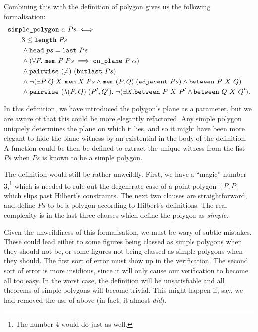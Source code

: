 Combining this with the definition of polygon gives us the following formalisation:
\begin{equation}\label{eq:SimplePolygonDef}
  \begin{split}
    &\code{simple\_polygon}\ \alpha\ Ps \iff \\
    &\qquad 3 \leq \code{length}\ Ps\\
    &\qquad\wedge \code{head}\ ps = \code{last}\ Ps\\
    &\qquad\wedge (\forall P.\;\code{mem}\ P\ Ps \implies \code{on\_plane}\ P\ \alpha)\\
    &\qquad\wedge \code{pairwise}\ (\neq)\ (\code{butlast}\ Ps)\\
    &\qquad\wedge \neg(\exists P\;Q\;X.\; \code{mem}\;X\;Ps\wedge\code{mem}\;(P,Q)\;(\code{adjacent}\;Ps)\wedge\between{P}{X}{Q})\\
    &\qquad\wedge \code{pairwise}\ (\lambda(P,Q)\;(P',Q').\;\neg(\exists X. \between{P}{X}{P'} \wedge \between{Q}{X}{Q'}).
  \end{split}
\end{equation}

In this definition, we have introduced the polygon's plane as a parameter, but we are aware of that this could be more elegantly refactored. Any simple polygon uniquely determines the plane on which it lies, and so it might have been more elegant to hide the plane witness by an existential in the body of the definition. A function could be then be defined to extract the unique witness from the list $Ps$ when $Ps$ is known to be a simple polygon. 

The definition would still be rather unweildly. First, we have a ``magic'' number 3,\footnote{The number $4$ would do just as well.} which is needed to rule out the degenerate case of a point polygon $[P,P]$ which slips past Hilbert's constraints. The next two clauses are straightforward, and define $Ps$ to be a polygon according to Hilbert's definitions. The real complexity is in the last three clauses which define the polygon as \emph{simple}. 

Given the unweildiness of this formalisation, we must be wary of subtle mistakes. These could lead either to some figures being classed as simple polygons when they should not be, or some figures not being classed as simple polygons when they should. The first sort of error must show up in the verification. The second sort of error is more insidious, since it will only cause our verification to become all too easy. In the worst case, the definition will be unsatisfiable and all theorems of simple polygons will become trivial. This might happen if, say, we had removed the use of  above (in fact, it almost \emph{did}).

